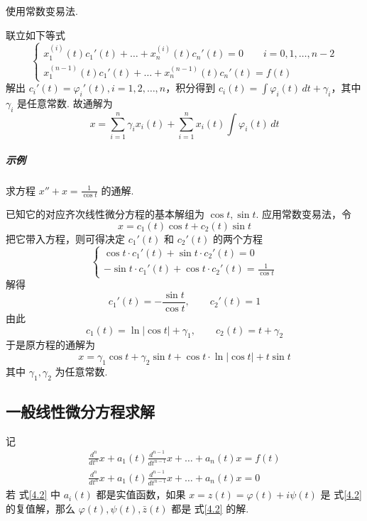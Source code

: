 \begin{note}
    使用常数变易法.
\end{note}
联立如下等式
$$
    \left\{\begin{array}{l}
        x_{1}^{(i)}(t)c_{1}'(t)+\dots+x_{n}^{(i)}(t)c_{n}'(t)=0 \qquad i=0,1,\dots,n-2 \\
        x_{1}^{(n-1)}(t)c_{1}'(t)+\dots+x_{n}^{(n-1)}(t)c_{n}'(t)=f(t)
    \end{array}\right.
$$
解出 $\displaystyle c_{i}'(t)=\varphi _{i}'(t),i=1,2,\dots,n$，积分得到 $\displaystyle c_{i}(t)=\int \varphi _{i}(t) \, dt+\gamma _{i}$，其中 $\displaystyle \gamma _{i}$ 是任意常数. 故通解为
$$
    x=\sum_{i=1}^{n} \gamma _{i}x_{i}(t)+\sum_{i=1}^{n} x_{i}(t)\int \varphi _{i}(t) \, dt
$$
\subparagraph{示例}

求方程 $\displaystyle x''+x=\frac{1}{\cos t}$ 的通解.

已知它的对应齐次线性微分方程的基本解组为 $\displaystyle \cos t,\sin t$. 应用常数变易法，令
$$
    x=c_{1}(t)\cos t+c_{2}(t)\sin t
$$
把它带入方程，则可得决定 $\displaystyle c_{1}'(t)$ 和 $\displaystyle c_{2}'(t)$ 的两个方程
$$
    \left\{\begin{array}{l}
        \cos t \cdot c_{1}'(t)+\sin t\cdot c_{2}'(t)=0 \\
        -\sin t\cdot c_{1}'(t)+\cos t\cdot c_{2}'(t)=\frac{1}{\cos t}
    \end{array}\right.
$$
解得
$$
    c_{1}'(t)=-\frac{\sin t}{\cos t},\qquad c_{2}'(t)=1
$$
由此
$$
    c_{1}(t)=\ln \lvert \cos t \rvert +\gamma_{1},\qquad c_{2}(t)=t+\gamma_{2}
$$
于是原方程的通解为
$$
    x=\gamma_{1}\cos t+\gamma_{2}\sin t+\cos t\cdot \ln \lvert \cos t \rvert +t\sin t
$$
其中 $\displaystyle \gamma_{1},\gamma_{2}$ 为任意常数.

\subsection{一般线性微分方程求解}

记
\begin{gather}
    \frac{d^{n}}{dt^{n}}x+a_{1}(t)\frac{d^{n-1}}{dt^{n-1}}x+\dots+a_{n}(t)x=f(t)\tag{4.1}  \\
    \frac{d^{n}}{dt^{n}}x+a_{1}(t)\frac{d^{n-1}}{dt^{n-1}}x+\dots+a_{n}(t)x=0 \tag{4.2}
\end{gather}
若 式\ref{4.2} 中 $\displaystyle a_{i}(t)$ 都是实值函数，如果 $\displaystyle x=z(t)=\varphi(t)+i\psi(t)$ 是 式\ref{4.2} 的复值解，那么 $\displaystyle \varphi(t),\psi(t),\bar{z}(t)$ 都是 式\ref{4.2} 的解.

